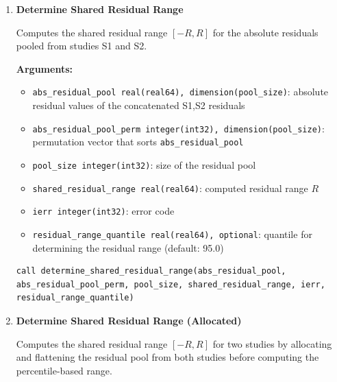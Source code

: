 \begin{enumerate}
    \item \textbf{Determine Shared Residual Range}

        Computes the shared residual range \([-R, R]\) for the absolute residuals pooled from studies S1 and S2.

        \textbf{Arguments:}
        \begin{itemize}
            \item \lstinline!abs_residual_pool real(real64), dimension(pool_size)!: absolute residual values of the concatenated S1,S2 residuals
            \item \lstinline!abs_residual_pool_perm integer(int32), dimension(pool_size)!: permutation vector that sorts \lstinline!abs_residual_pool!
            \item \lstinline!pool_size integer(int32)!: size of the residual pool
            \item \lstinline!shared_residual_range real(real64)!: computed residual range \(R\)
            \item \lstinline!ierr integer(int32)!: error code
            \item \lstinline!residual_range_quantile real(real64), optional!: quantile for determining the residual range (default: 95.0)
        \end{itemize}

\begin{lstlisting}[caption={Shared Residual Range}]
call determine_shared_residual_range(abs_residual_pool, abs_residual_pool_perm, pool_size, shared_residual_range, ierr, residual_range_quantile)
\end{lstlisting}
    
    \item \textbf{Determine Shared Residual Range (Allocated)}

        Computes the shared residual range \([-R, R]\) for two studies by allocating and flattening the residual pool from both studies before computing the percentile-based range.


\end{enumerate}
